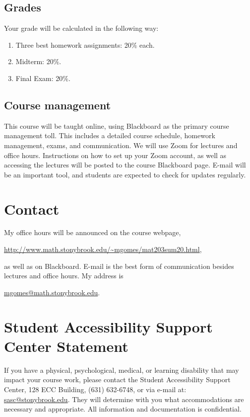\documentclass[11pt]{amsart}
\numberwithin{equation}{section}
\begin{document}
\subsection{Grades}
Your grade will be calculated in the following way:
\begin{enumerate}
\item Three best homework assignments: 20$\%$ each.
\item Midterm: 20$\%$.
\item Final Exam: 20$\%$.
\end{enumerate}

\subsection{Course management}

This course will be taught online, using Blackboard as the primary course management toll. This includes a detailed course schedule, homework management, exams, and communication. We will use Zoom for lectures and office hours. Instructions on how to set up your Zoom account, as well as accessing the lectures will be posted to the course Blackboard page. E-mail will be an important tool, and students are expected to check for updates regularly.

\section{Contact}
My office hours will be announced on the course webpage, 
\begin{center}
\url{http://www.math.stonybrook.edu/~mgomes/mat203sum20.html},
\end{center}
as well as on Blackboard. E-mail is the best form of communication besides lectures and office hours. My address is 
\begin{center}
\href{mailto: mgomes@math.stonybrook.edu}{ mgomes@math.stonybrook.edu}.
\end{center}

\section{Student Accessibility Support Center Statement}

If you have a physical, psychological, medical, or learning disability that may impact your course work, please contact the Student Accessibility Support Center, 128 ECC Building, (631) 632-6748, or via e-mail at: \href{mailto: sasc@stonybrook.edu}{sasc@stonybrook.edu}. They will determine with you what accommodations are necessary and appropriate. All information and documentation is confidential.
\end{document}
